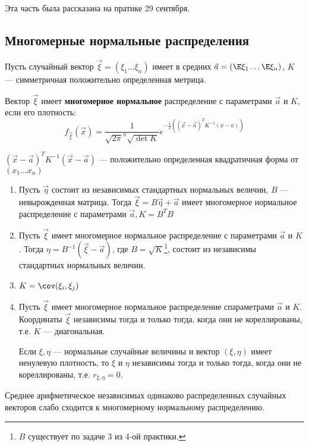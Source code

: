 \begin{remark}
    Эта часть была рассказана на пратике 29 сентября.
\end{remark}

\subsection{Многомерные нормальные распределения}

\begin{definition}
    Пусть случайный вектор \(\vec{\xi} = (\xi_1 \dots \xi_n)\) имеет в средних \(\vec{a} = (\E \xi_1 \dots \E \xi_n)\), \(K\) --- симметричная положительно определенная метрица.
    
    Вектор \(\vec{\xi}\) имеет \textbf{многомерное нормальное} распределение с параметрами \(\vec{a}\) и \(K\), если его плотность:
    \[f_{ \vec{\xi}}(\vec{x}) = \frac{1}{\sqrt{2 \pi}^n \sqrt{\det K}} e^{ - \frac{1}{2} ((\vec{x} - \vec{a})^T K^{-1} (\overline{x} - \overline{a}))}\]
\end{definition}
\begin{remark}
    \((\vec{x} - \vec{a})^T K^{-1} (\vec{x} - \vec{a})\) --- положительно определенная квадратичная форма от \((x_1 \dots x_n)\)
\end{remark}

\begin{prop}\itemfix
    \begin{enumerate}
        \item Пусть \(\vec{\eta}\) состоит из независимых стандартных нормальных величин, \(B\) --- невырожденная матрица. Тогда \(\vec{\xi} = B \vec{\eta} + \vec{a}\) имеет многомерное нормальное распределение с параметрами \(\vec{a}, K = B^TB\)
        \item Пусть \(\vec{\xi}\) имеет многомерное нормальное распределение с параметрами \(\vec{a}\) и \(K\). Тогда \(\eta = B^{-1}(\vec{\xi} - \vec{a})\), где \(B = \sqrt{K}\)\footnote{\(B\) существует по задаче 3 из 4-ой практики.}, состоит из независимы стандартных нормальных величин.
        \item \(K = \cov(\xi_i, \xi_j)\)
        \item Пусть \(\vec{\xi}\) имеет многомерное нормальное распределение спараметрами \(\vec{a}\) и \(K\). Координаты \(\vec{\xi}\) независимы тогда и только тогда, когда они не кореллированы, т.е. \(K\) --- диагональная.
        
            \begin{corollary}
                Если \(\xi, \eta\) --- нормальные случайные величины и вектор \((\xi, \eta)\) имеет ненулевую плотность, то \(\xi\) и \(\eta\) независимы тогда и только тогда, когда они не кореллированы, т.е. \(r_{\xi, \eta} = 0\).
            \end{corollary}
    \end{enumerate}
\end{prop}

\begin{theorem}
    Среднее арифметическое независимых одинаково распределенных случайных векторов слабо сходится к многомерному нормальному распределению.
\end{theorem}
